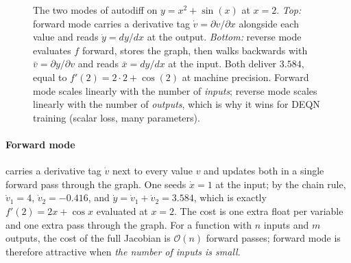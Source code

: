\documentclass[11pt,a4paper]{report}
\begin{document}
\begin{figure}[ht]
\caption{The two modes of autodiff on $y = x^2 + \sin(x)$ at $x = 2$.  \emph{Top:} forward mode carries a derivative tag $\dot v = \partial v / \partial x$ alongside each value and reads $\dot y = dy/dx$ at the output.  \emph{Bottom:} reverse mode evaluates $f$ forward, stores the graph, then walks backwards with $\bar v = \partial y / \partial v$ and reads $\bar x = dy/dx$ at the input.  Both deliver $3.584$, equal to $f'(2) = 2 \cdot 2 + \cos(2)$ at machine precision.  Forward mode scales linearly with the number of \emph{inputs}; reverse mode scales linearly with the number of \emph{outputs}, which is why it wins for DEQN training (scalar loss, many parameters).}
\label{fig:ad_graph}
\end{figure}

\paragraph{Forward mode} carries a derivative tag $\dot v$ next to every value $v$ and updates both in a single forward pass through the graph.  One seeds $\dot x = 1$ at the input; by the chain rule, $\dot v_1 = 4$, $\dot v_2 = -0.416$, and $\dot y = \dot v_1 + \dot v_2 = 3.584$, which is exactly $f'(2) = 2x + \cos x$ evaluated at $x=2$.  The cost is one extra float per variable and one extra pass through the graph.  For a function with $n$ inputs and $m$ outputs, the cost of the full Jacobian is $\mathcal{O}(n)$ forward passes; forward mode is therefore attractive when \emph{the number of inputs is small}.
\end{document}
